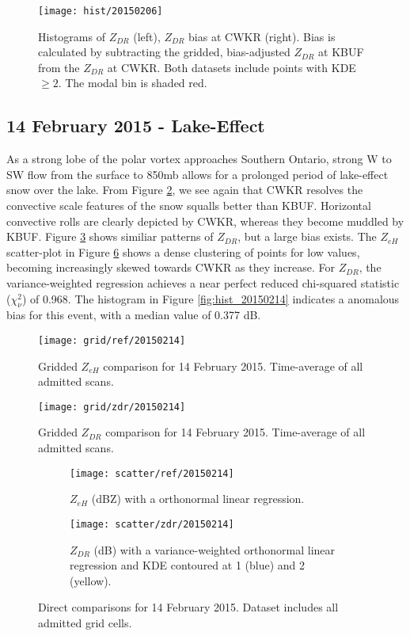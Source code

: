 \begin{figure}[H]
\texttt{[image: hist/20150206]}\centering
\caption{Histograms of $Z_{DR}$ (left), $Z_{DR}$ bias at CWKR (right). Bias is calculated by subtracting the gridded, bias-adjusted $Z_{DR}$ at KBUF from the
$Z_{DR}$ at CWKR. Both datasets include points with KDE $\geq 2$. The modal bin is shaded red.} 
\label{fig:hist_20150206}
\end{figure}

\subsection{14 February 2015 - Lake-Effect}
As a strong lobe of the polar vortex approaches Southern Ontario, strong W to SW flow from the surface to 850mb allows for a prolonged period of lake-effect snow over the lake. From Figure \ref{fig:grid_ref_20150214}, we see again that CWKR resolves the convective scale features of the snow squalls better than KBUF. Horizontal convective rolls are clearly depicted by CWKR, whereas they become muddled by KBUF. Figure \ref{fig:grid_zdr_20150214} shows similiar patterns of $Z_{DR}$, but a large bias exists. The $Z_{eH}$ scatter-plot in Figure \ref{fig:scatter_20150214} shows a dense clustering of points for low values, becoming increasingly skewed towards CWKR as they increase. For $Z_{DR}$, the variance-weighted regression achieves a near perfect reduced chi-squared statistic ($\chi^2_\nu$) of 0.968. The histogram in Figure \ref{fig:hist_20150214} indicates a anomalous bias for this event, with a median value of 0.377 dB.

\begin{figure}[p]
\texttt{[image: grid/ref/20150214]}
\caption{Gridded $Z_{eH}$ comparison for 14 February 2015. Time-average of all admitted scans.} 
\label{fig:grid_ref_20150214}
\end{figure}

\begin{figure}[p]
\texttt{[image: grid/zdr/20150214]}
\caption{Gridded $Z_{DR}$ comparison for 14 February 2015. Time-average of all admitted scans.} 
\label{fig:grid_zdr_20150214}
\end{figure}

\begin{figure}[p]
\centering
   \begin{subfigure}[t]{0.48\linewidth} \centering
     \texttt{[image: scatter/ref/20150214]}
     \caption{$Z_{eH}$ (dBZ) with a orthonormal linear regression.}\label{fig:scatter_ref_20150214}
   \end{subfigure}
   \begin{subfigure}[t]{0.48\linewidth} \centering
     \texttt{[image: scatter/zdr/20150214]}
     \caption{$Z_{DR}$ (dB) with a variance-weighted orthonormal linear regression and KDE contoured at 1 (blue) and 2 (yellow).}\label{fig:scatter_zdr_20150214}
   \end{subfigure}
\caption{Direct comparisons for 14 February 2015. Dataset includes all admitted grid cells.} \label{fig:scatter_20150214}
\end{figure}

